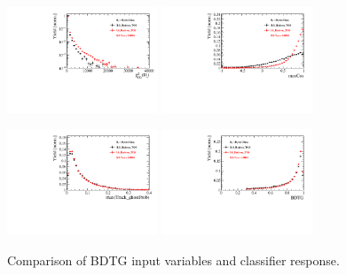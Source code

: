 \begin{figure}[h]
\includegraphics[height=!,width=0.4\textwidth]{figs/dataVsMC/trigger_norm/Ds2all_Ds_FDCHI2_ORIVX.pdf}
\includegraphics[height=!,width=0.4\textwidth]{figs/dataVsMC/trigger_norm/Ds2all_maxCos.pdf}

\includegraphics[height=!,width=0.4\textwidth]{figs/dataVsMC/trigger_norm/Ds2all_max_ghostProb.pdf}
\includegraphics[height=!,width=0.4\textwidth]{figs/dataVsMC/trigger_norm/Ds2all_BDTG_response.pdf}

\caption{Comparison of BDTG input variables and classifier response.}
\label{fig:}
\end{figure}
